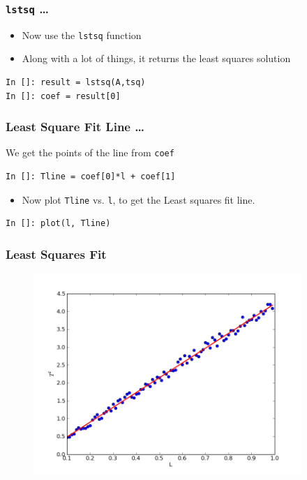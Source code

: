 \documentclass[14pt,compress]{beamer}
\newcommand{\typ}[1]{\lstinline{#1}}
\begin{document}
\begin{frame}[fragile]
\frametitle{\typ{lstsq} \ldots}
\begin{itemize}
\item Now use the \typ{lstsq} function
\item Along with a lot of things, it returns the least squares solution
\end{itemize}
\begin{lstlisting}
In []: result = lstsq(A,tsq)
In []: coef = result[0]
\end{lstlisting}
\end{frame}

\begin{frame}[fragile]
\frametitle{Least Square Fit Line \ldots}
We get the points of the line from \typ{coef}
\begin{lstlisting}
In []: Tline = coef[0]*l + coef[1]
\end{lstlisting}
\begin{itemize}
\item Now plot \typ{Tline} vs. \typ{l}, to get the Least squares fit line. 
\end{itemize}
\begin{lstlisting}
In []: plot(l, Tline)
\end{lstlisting}
\end{frame}

\begin{frame}[fragile]
\frametitle{Least Squares Fit}
\vspace{-0.15in}
\begin{figure}
\includegraphics[width=4in]{data/least-sq-fit}
\end{figure}
\end{frame}
\end{document}
